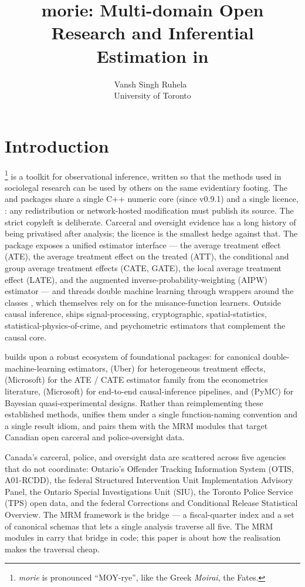 \documentclass[article,shortnames,nojss]{jss}
\title{morie: Multi-domain Open Research and Inferential Estimation in \proglang{Python}}
\author{Vansh Singh Ruhela~\orcidlink{0009-0004-1750-3592}\\University of Toronto}
\newcommand{\OTIS}{\textsf{OTIS}}
\newcommand{\SIU}{\textsf{SIU}}
\newcommand{\TPS}{\textsf{TPS}}
\begin{document}
\sloppy

\section{Introduction}
\label{sec:intro}

\footnote{\textit{morie} is pronounced ``MOY-rye'',
like the Greek \textit{Moirai}, the Fates.} is a
 toolkit for observational inference, written
so that the methods used in sociolegal research can be used by
others on the same evidentiary footing. The 
and  packages \citep{Ruhela2026MorieR} share a
single C++ numeric core (since v0.9.1) and a single licence,
: any redistribution or
network-hosted modification must publish its source. The strict
copyleft is deliberate. Carceral and oversight evidence has a
long history of being privatised after analysis; the licence is
the smallest hedge against that. The package exposes a unified
estimator interface --- the average treatment effect (ATE), the
average treatment effect on the treated (ATT), the conditional
and group average treatment effects (CATE, GATE), the local
average treatment effect (LATE), and the augmented
inverse-probability-weighting (AIPW) estimator --- and threads
double machine learning through wrappers around the
 classes
\citep{Bach2022DoubleMLpy, Bach2024DoubleML}, which themselves
rely on  \citep{Pedregosa2011} for the
nuisance-function learners. Outside causal inference,
 ships signal-processing, cryptographic,
spatial-statistics, statistical-physics-of-crime, and
psychometric estimators that complement the causal core.

 builds upon a robust ecosystem of foundational
 packages: 
\citep{Bach2022DoubleMLpy} for canonical
double-machine-learning estimators,  (Uber) for
heterogeneous treatment effects,  (Microsoft) for
the ATE / CATE estimator family from the econometrics
literature,  (Microsoft) for end-to-end
causal-inference pipelines, and  (PyMC) for
Bayesian quasi-experimental designs. Rather than reimplementing
these established methods,  unifies them under a
single function-naming convention and a single result idiom,
and pairs them with the MRM modules that target Canadian open
carceral and police-oversight data.

Canada's carceral, police, and oversight data are scattered
across five agencies that do not coordinate: Ontario's
Offender Tracking Information System (\OTIS, A01-RCDD), the
federal Structured Intervention Unit Implementation Advisory
Panel, the Ontario Special Investigations Unit (\SIU), the
Toronto Police Service (\TPS) open data, and the federal
Corrections and Conditional Release Statistical Overview. The
MRM framework \citep{Ruhela2026MRM} is the bridge --- a
fiscal-quarter index and a set of canonical schemas that lets
a single analysis traverse all five. The MRM modules in
 carry that bridge in code; this paper is about how
the  realisation makes the traversal cheap.
\end{document}
